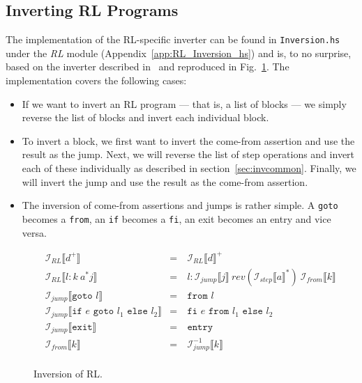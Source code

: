 \subsection{Inverting RL Programs}

The implementation of the RL-specific inverter can be found in \texttt{Inversion.hs} under the \textit{RL} module (Appendix~\ref{app:RL_Inversion_hs}) and is, to no surprise, based on the inverter described in~\cite[Fig.~19]{REV} and reproduced in Fig.~\ref{fig:inversion_rl}. The implementation covers the following cases:
\begin{itemize}
  \item If we want to invert an RL program --- that is, a list of blocks --- we simply reverse the list of blocks and invert each individual block.

  \item To invert a block, we first want to invert the come-from assertion and use the result as the jump. Next, we will reverse the list of step operations and invert each of these individually as described in section~\ref{sec:invcommon}. Finally, we will invert the jump and use the result as the come-from assertion.

  \item The inversion of come-from assertions and jumps is rather simple. A \texttt{goto} becomes a \texttt{from}, an \texttt{if} becomes a \texttt{fi}, an exit becomes an entry and vice versa.
\end{itemize}

\begin{figure}
  $$\begin{aligned}
    & \mathcal{I}_{RL}\llbracket d^+\rrbracket & =\ & \mathcal{I}_{RL}\llbracket d\rrbracket^+\\
    & \mathcal{I}_{RL}\llbracket l : k\ a^* j\rrbracket & =\ & l: \mathcal{I}_{jump}\llbracket j\rrbracket\ rev(\mathcal{I}_{step}\llbracket a\rrbracket^*)\ \mathcal{I}_{from}\llbracket k\rrbracket\\
    & \mathcal{I}_{jump}\llbracket\texttt{goto }l\rrbracket & =\ & \texttt{from }l\\
    & \mathcal{I}_{jump}\llbracket\texttt{if }e\texttt{ goto }l_1\texttt{ else }l_2\rrbracket & =\ & \texttt{fi }e\texttt{ from }l_1\texttt{ else }l_2\\
    & \mathcal{I}_{jump}\llbracket\texttt{exit}\rrbracket & =\ & \texttt{entry}\\
    & \mathcal{I}_{from}\llbracket k\rrbracket & =\ & \mathcal{I}_{jump}^{-1}\llbracket k\rrbracket\\
  \end{aligned}$$
  \caption{Inversion of RL.}
  \label{fig:inversion_rl}
\end{figure}

